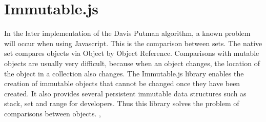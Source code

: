 \section{Immutable.js}
\label{sec:tecImmutable}
In the later implementation of the Davis Putman algorithm, a known problem will occur when using Javascript. This is the comparison between sets. The native set compares objects via Object by Object Reference. Comparisons with mutable objects are usually very difficult, because when an object changes, the location of the object in a collection also changes. The Immutable.js library enables the creation of immutable objects that cannot be changed once they have been created. It also provides several persistent immutable data structures such as stack, set and range for developers. Thus this library solves the problem of comparisons between objects. \cite{Immutable.jsAuthors2019}, \cite{Rauschmayer2015}

